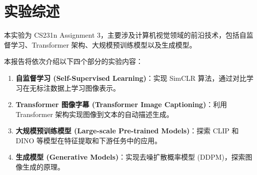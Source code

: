 \chapter{实验综述}
\label{chap:overview}

本实验为 CS231n Assignment 3，主要涉及计算机视觉领域的前沿技术，包括自监督学习、Transformer 架构、大规模预训练模型以及生成模型。

本报告将依次介绍以下四个部分的实验内容：
\begin{enumerate}
    \item \textbf{自监督学习 (Self-Supervised Learning)}：实现 SimCLR 算法，通过对比学习在无标注数据上学习图像表示。
    \item \textbf{Transformer 图像字幕 (Transformer Image Captioning)}：利用 Transformer 架构实现图像到文本的自动描述生成。
    \item \textbf{大规模预训练模型 (Large-scale Pre-trained Models)}：探索 CLIP 和 DINO 等模型在特征提取和下游任务中的应用。
    \item \textbf{生成模型 (Generative Models)}：实现去噪扩散概率模型 (DDPM)，探索图像生成的原理。
\end{enumerate}
